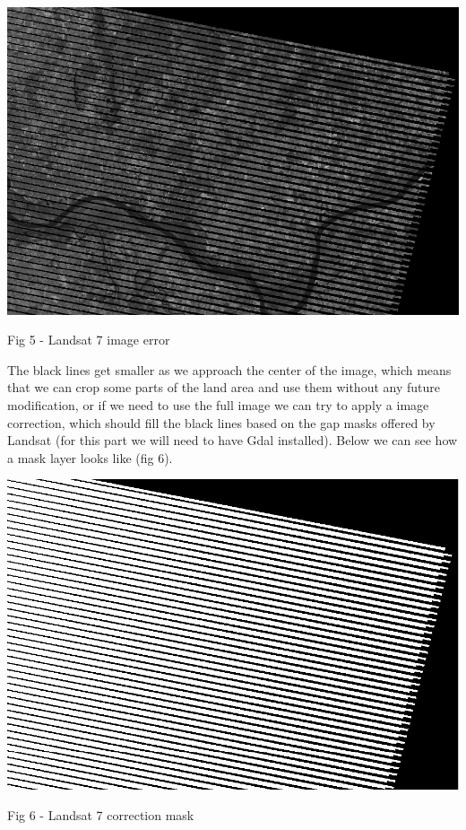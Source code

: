 \documentclass[12pt, a4paper]{report}
\begin{document}
\bigskip

\includegraphics[scale=0.54, center]{landsat_black_stripes.png} 
\begin{center}
Fig 5 - Landsat 7 image error
\end{center}
\par 

\quad
The black lines get smaller as we approach the center of the image, which means that we can crop some parts of the land area and use them without any future modification, or if we need to use the full image we can try to apply a image correction, which should fill the black lines based on the gap masks offered by Landsat (for this part we will need to have Gdal installed). Below we can see how a mask layer looks like (fig 6).
\par 


\bigskip

\includegraphics[scale=0.54, center]{landsat_black_stripes_correction.png} 
\begin{center}
Fig 6 - Landsat 7 correction mask
\end{center}
\par 
\end{document}
